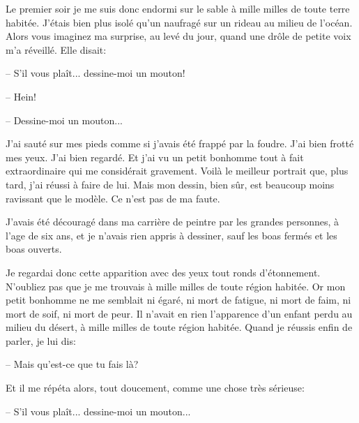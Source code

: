\documentclass[a4paper]{report}
\begin{document}
Le premier soir je me suis donc endormi sur le sable à mille milles de toute terre habitée. J'étais bien plus isolé qu'un naufragé sur un rideau au milieu de l'océan. Alors vous imaginez ma surprise, au levé du jour, quand une drôle de petite voix m'a réveillé. Elle disait:

-- S'il vous plaît... dessine-moi un mouton!

-- Hein!

-- Dessine-moi un mouton...

J'ai sauté sur mes pieds comme si j'avais été frappé par la foudre. J'ai bien frotté mes yeux. J'ai bien regardé. Et j'ai vu un petit bonhomme tout à fait extraordinaire qui me considérait gravement. Voilà le meilleur portrait que, plus tard, j'ai réussi à faire de lui. Mais mon dessin, bien sûr, est beaucoup moins ravissant que le modèle. Ce n'est pas de ma faute.

J'avais été découragé dans ma carrière de peintre par les grandes personnes, à l'age de six ans, et je n'avais rien appris à dessiner, sauf les boas fermés et les boas ouverts.


Je regardai donc cette apparition avec des yeux tout ronds d'étonnement. N'oubliez pas que je me trouvais à mille milles de toute région habitée. Or mon petit bonhomme ne me semblait ni égaré, ni mort de fatigue, ni mort de faim, ni mort de soif, ni mort de peur. Il n'avait en rien l'apparence d'un enfant perdu au milieu du désert, à mille milles de toute région habitée. Quand je réussis enfin de parler, je lui dis:

-- Mais qu'est-ce que tu fais là?

Et il me répéta alors, tout doucement, comme une chose très sérieuse:

-- S'il vous plaît... dessine-moi un mouton...
\end{document}
